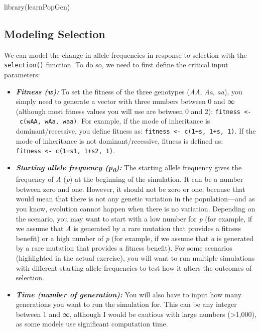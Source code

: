 \documentclass[
]{book}
\newenvironment{Shaded}{\begin{snugshade}}{\end{snugshade}}
\newcommand{\FunctionTok}[1]{\textcolor[rgb]{0.00,0.00,0.00}{#1}}
\newcommand{\NormalTok}[1]{#1}
\begin{document}
\begin{Shaded}
\begin{Highlighting}[]
\FunctionTok{library}\NormalTok{(learnPopGen)}
\end{Highlighting}
\end{Shaded}

\hypertarget{modeling-selection}{%
\subsection{Modeling Selection}\label{modeling-selection}}

We can model the change in allele frequencies in response to selection with the \texttt{selection()} function. To do so, we need to first define the critical input parameters:

\begin{itemize}
\item
  \textbf{\emph{Fitness (w):}} To set the fitness of the three genotypes (\emph{AA}, \emph{Aa}, \emph{aa}), you simply need to generate a vector with three numbers between 0 and ∞ (although most fitness values you will use are between 0 and 2): \texttt{fitness\ \textless{}-\ c(wAA,\ wAa,\ waa)}. For example, if the mode of inheritance is dominant/recessive, you define fitness as: \texttt{fitness\ \textless{}-\ c(1+s,\ 1+s,\ 1)}. If the mode of inheritance is not dominant/recessive, fitness is defined as: \texttt{fitness\ \textless{}-\ c(1+s1,\ 1+s2,\ 1)}.
\item
  \textbf{\emph{Starting allele frequency (p\textsubscript{0}):}} The starting allele frequency gives the frequency of \emph{A} (\emph{p}) at the beginning of the simulation. It can be a number between zero and one. However, it should not be zero or one, because that would mean that there is not any genetic variation in the population---and as you know, evolution cannot happen when there is no variation. Depending on the scenario, you may want to start with a low number for \emph{p} (for example, if we assume that \emph{A} is generated by a rare mutation that provides a fitness benefit) or a high number of \emph{p} (for example, if we assume that \emph{a} is generated by a rare mutation that provides a fitness benefit). For some scenarios (highlighted in the actual exercise), you will want to run multiple simulations with different starting allele frequencies to test how it alters the outcomes of selection.
\item
  \textbf{\emph{Time (number of generation):}} You will also have to input how many generations you want to run the simulation for. This can be any integer between 1 and ∞, although I would be cautious with large numbers (\textgreater1,000), as some models use significant computation time.
\end{itemize}
\end{document}
